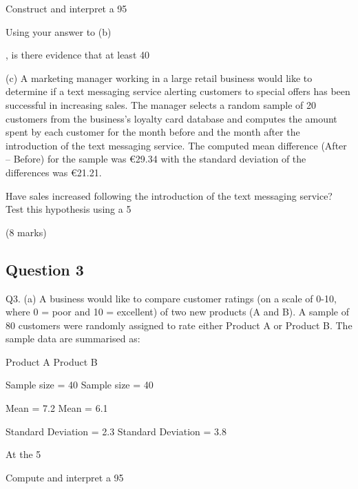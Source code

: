 \item[(i)] Construct and interpret a 95%

\item[(ii)] Using your answer to (b) \item[(i)], is there evidence that at least 40%


(c) A marketing manager working in a large retail business would like to determine if a text messaging service alerting customers to special offers has been successful in increasing sales. The manager selects a random sample of 20 customers from the business’s loyalty card database and computes the amount spent by each customer for the month before and the month after the introduction of the text messaging service. The computed mean difference (After – Before) for the sample was €29.34 with the standard deviation of the differences was €21.21.

Have sales increased following the introduction of the text messaging service? Test this hypothesis using a 5%

(8 marks)

\newpage
\subsection*{Question 3}

Q3. (a) A business would like to compare customer ratings (on a scale of 0-10, where 0 = poor and 10 = excellent) of two new products (A and B). A sample of 80 customers were randomly assigned to rate either Product A or Product B. The sample data are summarised as:

Product A Product B

Sample size = 40 Sample size = 40

Mean = 7.2 Mean = 6.1

Standard Deviation = 2.3 Standard Deviation = 3.8

\item[(i)] At the 5%

\item[(ii)] Compute and interpret a 95%


